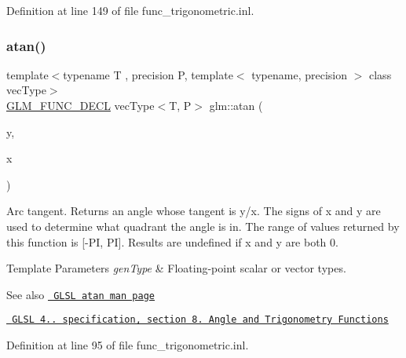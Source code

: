 Definition at line 149 of file func\+\_\+trigonometric.\+inl.

\mbox{\label{group__core__func__trigonometric_ga461e769acb8b8cb695a5a89334546611}} 
\subsubsection{\texorpdfstring{atan()}{atan()}\hspace{0.1cm}{\footnotesize\ttfamily [1/2]}}
{\footnotesize\ttfamily template$<$typename T , precision P, template$<$ typename, precision $>$ class vec\+Type$>$ \\
\mbox{\hyperlink{setup_8hpp_ab2d052de21a70539923e9bcbf6e83a51}{G\+L\+M\+\_\+\+F\+U\+N\+C\+\_\+\+D\+E\+CL}} vec\+Type$<$T, P$>$ glm\+::atan (\begin{DoxyParamCaption}\item[{vec\+Type$<$ T, P $>$ const \&}]{y,  }\item[{vec\+Type$<$ T, P $>$ const \&}]{x }\end{DoxyParamCaption})}

Arc tangent. Returns an angle whose tangent is y/x. The signs of x and y are used to determine what quadrant the angle is in. The range of values returned by this function is \mbox{[}-\/PI, PI\mbox{]}. Results are undefined if x and y are both 0.


\begin{DoxyTemplParams}{Template Parameters}
{\em gen\+Type} & Floating-\/point scalar or vector types.\\
\hline
\end{DoxyTemplParams}
\begin{DoxySeeAlso}{See also}
\href{http://www.opengl.org/sdk/docs/manglsl/xhtml/atan.xml}{\texttt{ G\+L\+SL atan man page}} 

\href{http://www.opengl.org/registry/doc/GLSLangSpec.4.20.8.pdf}{\texttt{ G\+L\+SL 4.. specification, section 8. Angle and Trigonometry Functions}} 
\end{DoxySeeAlso}


Definition at line 95 of file func\+\_\+trigonometric.\+inl.

\mbox{\label{group__core__func__trigonometric_gae8f22458bba8f2321ceb1bfc4a543216}} 
